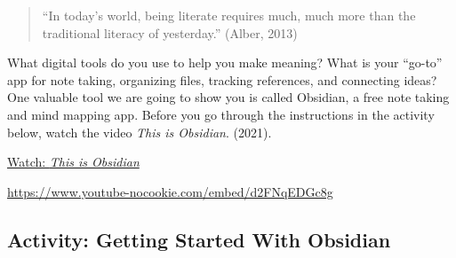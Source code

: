 \documentclass[
  letterpaper,
  DIV=11,
  numbers=noendperiod]{scrreprt}
\begin{document}
\begin{quote}
``In today's world, being literate requires much, much more than the
traditional literacy of yesterday.'' (Alber, 2013)
\end{quote}

What digital tools do you use to help you make meaning? What is your
``go-to'' app for note taking, organizing files, tracking references,
and connecting ideas? One valuable tool we are going to show you is
called Obsidian, a free note taking and mind mapping app. Before you go
through the instructions in the activity below, watch the video
\emph{This is Obsidian}. (2021).

\href{https://www.youtube.com/watch?v=d2FNqEDGc8g}{Watch: \emph{This is
Obsidian}}

\url{https://www.youtube-nocookie.com/embed/d2FNqEDGc8g}

\subsection{Activity: Getting Started With
Obsidian}\label{activity-getting-started-with-obsidian}
\end{document}
